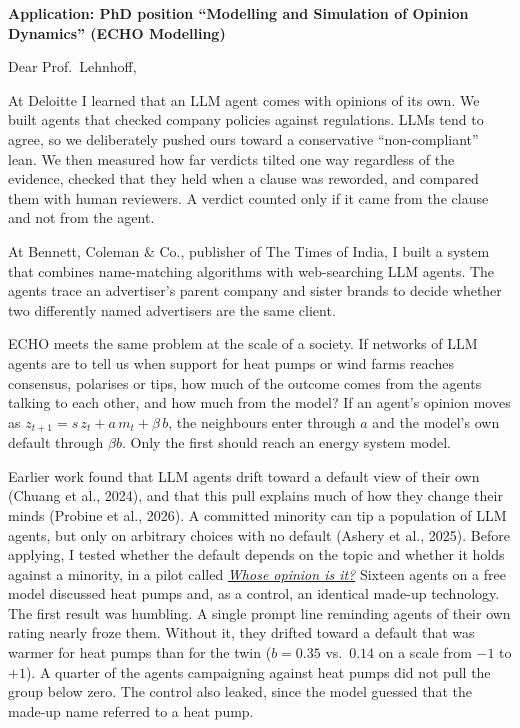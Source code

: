 \documentclass[11pt]{article}
\begin{document}

\textbf{Application: PhD position ``Modelling and Simulation of Opinion Dynamics'' (ECHO Modelling)}

Dear Prof.\ Lehnhoff,

At Deloitte I learned that an LLM agent comes with opinions of its own. We built agents that checked company policies against regulations. LLMs tend to agree, so we deliberately pushed ours toward a conservative ``non-compliant'' lean. We then measured how far verdicts tilted one way regardless of the evidence, checked that they held when a clause was reworded, and compared them with human reviewers. A verdict counted only if it came from the clause and not from the agent.

At Bennett, Coleman \& Co., publisher of The Times of India, I built a system that combines name-matching algorithms with web-searching LLM agents. The agents trace an advertiser's parent company and sister brands to decide whether two differently named advertisers are the same client.

ECHO meets the same problem at the scale of a society. If networks of LLM agents are to tell us when support for heat pumps or wind farms reaches consensus, polarises or tips, how much of the outcome comes from the agents talking to each other, and how much from the model? If an agent's opinion moves as $z_{t+1} = s\,z_t + a\,m_t + \beta\,b$, the neighbours enter through $a$ and the model's own default through $\beta b$. Only the first should reach an energy system model.

Earlier work found that LLM agents drift toward a default view of their own (Chuang et al., 2024), and that this pull explains much of how they change their minds (Probine et al., 2026). A committed minority can tip a population of LLM agents, but only on arbitrary choices with no default (Ashery et al., 2025). Before applying, I tested whether the default depends on the topic and whether it holds against a minority, in a pilot called \href{https://github.com/obaidtoi/whose-opinion/blob/main/reports/pilot_report.pdf}{\emph{Whose opinion is it?}} Sixteen agents on a free model discussed heat pumps and, as a control, an identical made-up technology. The first result was humbling. A single prompt line reminding agents of their own rating nearly froze them. Without it, they drifted toward a default that was warmer for heat pumps than for the twin ($b = 0.35$ vs.\ $0.14$ on a scale from $-1$ to $+1$). A quarter of the agents campaigning against heat pumps did not pull the group below zero. The control also leaked, since the model guessed that the made-up name referred to a heat pump.
\end{document}
